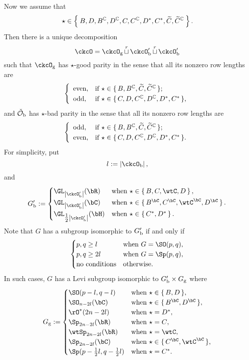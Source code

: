 \documentclass[counting_main.tex]{subfiles}
\begin{document}
Now we assume that
\[
  \star\in \Set{ B, D, B^{\mathbb{C}}, D^{\mathbb{C}}, C, C^{\mathbb{C}}, D^*, C^*, \widetilde C, \widetilde C^{\mathbb{C}}}.
\]
Then there is a unique decomposition
\[
  \ckcO=\ckcOg \cuprow \ckcOpb\cuprow \ckcOpb
\]
such that $\ckcOg$ has $\star$-good parity in the sense that all its nonzero row
lengths are
\[
  \left\{
    \begin{array}{ll}
      \textrm{even}, &\hbox{if $\star\in \set{B, B^\C, \widetilde C, \widetilde C^\C}$}; \smallskip\\
      \textrm{odd}, &\hbox{if $\star\in \set{C, D, C^\C, D^\C, D^*, C^*}$},
    \end{array}
  \right.
\]
and $\check {{\mathcal {O}}}_{\mathrm b}$ has $\star$-bad parity in the sense that all its
nonzero row lengths are
\[
  \left\{
    \begin{array}{ll}
      \textrm{odd}, &\hbox{if  $\star\in \set{B, B^\C, \widetilde C, \widetilde C^\C}$}; \smallskip\\
      \textrm{even}, &\hbox{if  $\star\in \set{C, D, C^\C, D^\C, D^*, C^*}$}.
    \end{array}
  \right.
\]
For simplicity, put
\[
  l:=\abs{\ckcOb},
\]
and
\[
  \Gpb := \begin{cases}
    \GL_{\abs{\ckcOpb}}(\bR) & \text{when } \star \in \set{B,C,\wtC,D}, \\
    \GL_{\abs{\ckcOpb}}(\bC) & \text{when } \star \in \set{B^{\bC},C^{\bC},\wtC^{\bC},D^{\bC}}. \\
    \GL_{\half \abs{\ckcOpb}}(\bH) & \text{when } \star \in \set{C^{*},D^{*}}. \\
  \end{cases}
\]
Note that $G$ has a subgroup isomorphic to $G'_{\mathrm b}$ if and only if
\[
  \begin{cases}
    p,q\geq l & \text{when $G = \SO(p,q)$},\\
    p,q\geq 2l &  \text{when $G = \Sp(p,q)$},\\
    \text{no conditions} & \text{otherwise}.
  \end{cases}
\]
In such cases, $G$ has a Levi subgroup isomorphic to $G'_{\mathrm b}\times G_{\mathrm g}$ where
\[
  \Gg :=
  \begin{cases}
    \SO(p-l,q-l) & \textrm{when $\star\in \set{B,D}$},\\
    \SO_{n-2l}(\bC) &\textrm{when $\star\in \set{B^{\bC},D^{\bC}}$},\\
    \rO^{*}(2n-2l) &\textrm{when $\star = D^{*}$},\\
    \Sp_{2n-2l}(\bR) &\textrm{when $\star = C$},\\
    \wtSp_{2n-2l}(\bR) &\textrm{when $\star = \wtC$},\\
    \Sp_{2n-2l}(\bC) &\textrm{when $\star \in \set{C^{\bC},\wtC^{\bC}}$},\\
    \Sp(p-\half l,q-\half l) &\textrm{when $\star = C^{*}$}.\\
  \end{cases}
\]
\end{document}
